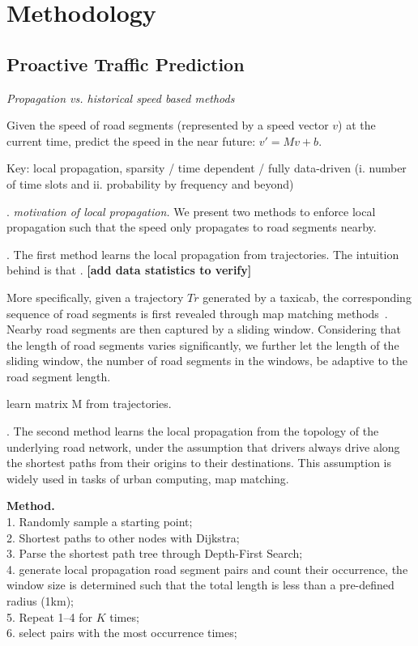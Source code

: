 \section{Methodology}
\label{sec-method}


\subsection{Proactive Traffic Prediction}
\label{subsec-proactive}

{\em Propagation vs. historical speed based methods}

Given the speed of road segments (represented by a speed vector $v$) at the current time, predict the speed in the near future: $v'=Mv+b$.

Key: local propagation, \ie sparsity / time dependent / fully data-driven (i. number of time slots and ii. probability by frequency and beyond)


.
{\em motivation of local propagation.}
We present two methods to enforce local propagation such that the speed only propagates to road segments nearby.

.
The first method learns the local propagation from trajectories. The intuition behind is that {\em }. {\bf [add data statistics to verify]}

More specifically, given a trajectory $Tr$ generated by a taxicab, the corresponding sequence of road segments is first revealed through map matching methods~\cite{Newson2009MM}. Nearby road segments are then captured by a sliding window. Considering that the length of road segments varies significantly, we further let the length of the sliding window, \ie the number of road segments in the windows, be adaptive to the road segment length.

\begin{example}
learn matrix M from trajectories.
\end{example}

.
The second method learns the local propagation from the topology of the underlying road network, under the assumption that drivers always drive along the shortest paths from their origins to their destinations. This assumption is widely used in tasks of urban computing, \eg map matching.

{\bf Method.} \\
1. Randomly sample a starting point; \\
2. Shortest paths to other nodes with Dijkstra; \\
3. Parse the shortest path tree through Depth-First Search; \\
4. generate local propagation road segment pairs and count their occurrence, the window size is determined such that the total length is less than a pre-defined radius (1km); \\
5. Repeat 1--4 for $K$ times; \\
6. select pairs with the most occurrence times;

